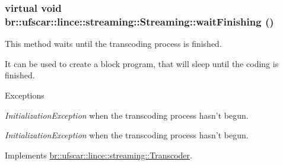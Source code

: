 \hypertarget{classbr_1_1ufscar_1_1lince_1_1streaming_1_1Streaming_abe9c0683b3b97fe5c924907ce4c7b803}{
\subsubsection[{waitFinishing}]{\setlength{\rightskip}{0pt plus 5cm}virtual void br::ufscar::lince::streaming::Streaming::waitFinishing ()}}
\label{classbr_1_1ufscar_1_1lince_1_1streaming_1_1Streaming_abe9c0683b3b97fe5c924907ce4c7b803}


This method waits until the transcoding process is finished. 

It can be used to create a block program, that will sleep until the coding is finished. 
\begin{DoxyExceptions}{Exceptions}
\item[{\em InitializationException}]when the transcoding process hasn't begun. \item[{\em InitializationException}]when the transcoding process hasn't begun. \end{DoxyExceptions}


Implements \hyperlink{classbr_1_1ufscar_1_1lince_1_1streaming_1_1Transcoder_abec1e8b2d9e04e79bf878206a70df2d9}{br::ufscar::lince::streaming::Transcoder}.



